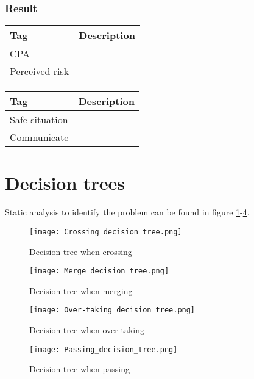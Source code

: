\subsubsection{Result}
\begin{table}[H]
	\begin{tabular}{p{}|p{}}
		\toprule
		Tag & Description\\
		\midrule
		CPA & \\
		Perceived risk & \\
		\bottomrule
	\end{tabular}
	
	\label{tab:criteria-safe-situation}
\end{table}

\begin{table}[H]
	\begin{tabular}{p{}|p{}}
		\toprule
		Tag & Description\\
		\midrule
		Safe situation & \\
		Communicate & \\
		\bottomrule
	\end{tabular}
	
	\label{tab:result}
\end{table}


\section{Decision trees}
Static analysis to identify the problem can be found in figure \ref{fig:Crossing_decision_tree}-\ref{fig:Passing_decision_tree}.

\begin{figure}[p]
	\centering
	\texttt{[image: Crossing\_decision\_tree.png]}
	\caption{Decision tree when crossing}
	\label{fig:Crossing_decision_tree}
\end{figure}


\begin{figure}[p]
	\centering
	\texttt{[image: Merge\_decision\_tree.png]}
	\caption{Decision tree when merging}
	\label{fig:Merge_decision_tree}
\end{figure}


\begin{figure}[p]
	\centering
	\texttt{[image: Over-taking\_decision\_tree.png]}
	\caption{Decision tree when over-taking}
	\label{fig:Over-taking_decision_tree}
\end{figure}


\begin{figure}[p]
	\centering
	\texttt{[image: Passing\_decision\_tree.png]}
	\caption{Decision tree when passing}
	\label{fig:Passing_decision_tree}
\end{figure}


